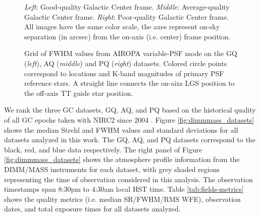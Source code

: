 \documentclass[]{spie}  %
\begin{document}
\begin{figure}[!h]
 \caption{\footnotesize \textit{Left}: Good-quality Galactic Center frame. \textit{Middle}: Average-quality Galactic Center frame. \textit{Right}: Poor-quality Galactic Center frame. All images have the same color scale, the axes represent on-sky separation (in arcsec) from the on-axis (i.e. center) frame position. \label{fig:gc_images}}
\end{figure}

\begin{figure}
 \caption{\footnotesize Grid of FWHM values from AIROPA variable-PSF mode on the GQ (\textit{left}), AQ (\textit{middle}) and PQ (\textit{right}) datasets. Colored circle points correspond to locations and K-band magnitudes of primary PSF reference stars. A straight line connects the on-aixs LGS position to the off-axis TT guide star position. \label{fig:fwhm_grids}}
\end{figure}

\indent We rank the three GC datasets, GQ, AQ, and PQ based on the historical quality of all GC epochs taken with NIRC2 since 2004 \citep{jia:2019a}. Figure \ref{fig:dimmmass_datasets} shows the median Strehl and FWHM values and standard deviations for all datasets analyzed in this work. The GQ, AQ, and PQ datasets correspond to the black, red, and blue data respectively. The right panel of Figure \ref{fig:dimmmass_datasets} shows the atmosphere profile information from the DIMM/MASS instruments for each dataset, with grey shaded regions representing the time of observation considered in this analysis. The observation timestamps span 8:30pm to 4:30am local HST time. Table \ref{tab:fields-metrics} shows the quality metrics (i.e. median SR/FWHM/RMS WFE), observation dates, and total exposure times for all datasets analyzed.
\end{document}
